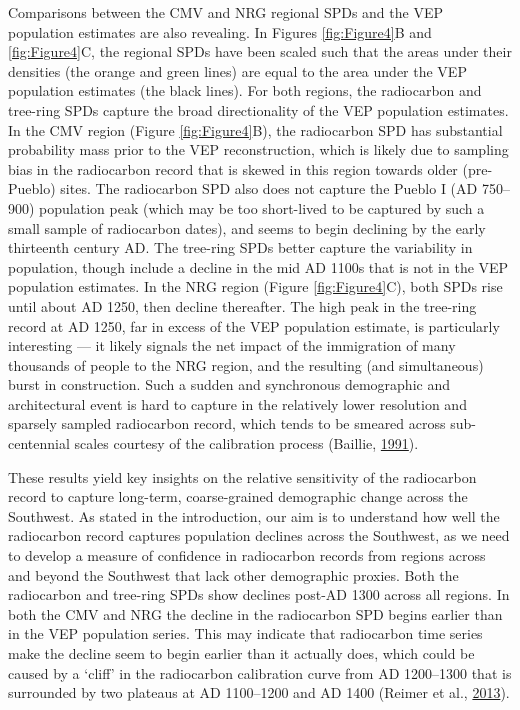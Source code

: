 \documentclass[
]{sa}
\begin{document}
Comparisons between the CMV and NRG regional SPDs and the VEP population estimates are also revealing. In Figures \ref{fig:Figure4}B and \ref{fig:Figure4}C, the regional SPDs have been scaled such that the areas under their densities (the orange and green lines) are equal to the area under the VEP population estimates (the black lines). For both regions, the radiocarbon and tree-ring SPDs capture the broad directionality of the VEP population estimates. In the CMV region (Figure \ref{fig:Figure4}B), the radiocarbon SPD has substantial probability mass prior to the VEP reconstruction, which is likely due to sampling bias in the radiocarbon record that is skewed in this region towards older (pre-Pueblo) sites. The radiocarbon SPD also does not capture the Pueblo I (AD 750--900) population peak (which may be too short-lived to be captured by such a small sample of radiocarbon dates), and seems to begin declining by the early thirteenth century AD. The tree-ring SPDs better capture the variability in population, though include a decline in the mid AD 1100s that is not in the VEP population estimates. In the NRG region (Figure \ref{fig:Figure4}C), both SPDs rise until about AD 1250, then decline thereafter. The high peak in the tree-ring record at AD 1250, far in excess of the VEP population estimate, is particularly interesting --- it likely signals the net impact of the immigration of many thousands of people to the NRG region, and the resulting (and simultaneous) burst in construction. Such a sudden and synchronous demographic and architectural event is hard to capture in the relatively lower resolution and sparsely sampled radiocarbon record, which tends to be smeared across sub-centennial scales courtesy of the calibration process (Baillie, \protect\hyperlink{ref-Baillie1991}{1991}).

These results yield key insights on the relative sensitivity of the radiocarbon record to capture long-term, coarse-grained demographic change across the Southwest. As stated in the introduction, our aim is to understand how well the radiocarbon record captures population declines across the Southwest, as we need to develop a measure of confidence in radiocarbon records from regions across and beyond the Southwest that lack other demographic proxies. Both the radiocarbon and tree-ring SPDs show declines post-AD 1300 across all regions. In both the CMV and NRG the decline in the radiocarbon SPD begins earlier than in the VEP population series. This may indicate that radiocarbon time series make the decline seem to begin earlier than it actually does, which could be caused by a `cliff' in the radiocarbon calibration curve from AD 1200--1300 that is surrounded by two plateaus at AD 1100--1200 and AD 1400 (Reimer et al., \protect\hyperlink{ref-Reimer2013}{2013}).
\end{document}

